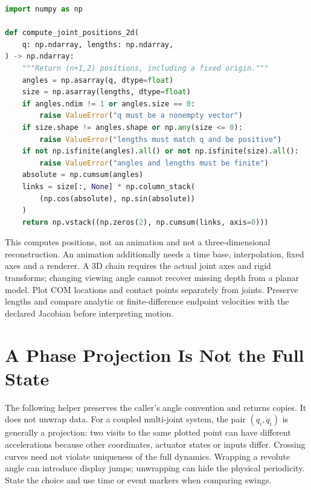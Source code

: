 \begin{lstlisting}[language=Python, caption={Planar Joint Positions With Relative Angles}]
import numpy as np

def compute_joint_positions_2d(
    q: np.ndarray, lengths: np.ndarray,
) -> np.ndarray:
    """Return (n+1,2) positions, including a fixed origin."""
    angles = np.asarray(q, dtype=float)
    size = np.asarray(lengths, dtype=float)
    if angles.ndim != 1 or angles.size == 0:
        raise ValueError("q must be a nonempty vector")
    if size.shape != angles.shape or np.any(size <= 0):
        raise ValueError("lengths must match q and be positive")
    if not np.isfinite(angles).all() or not np.isfinite(size).all():
        raise ValueError("angles and lengths must be finite")
    absolute = np.cumsum(angles)
    links = size[:, None] * np.column_stack(
        (np.cos(absolute), np.sin(absolute))
    )
    return np.vstack((np.zeros(2), np.cumsum(links, axis=0)))
\end{lstlisting}

This computes positions, not an animation and not a three-dimensional
reconstruction. An animation additionally needs a time base, interpolation,
fixed axes and a renderer. A 3D chain requires the actual joint axes and
rigid transforms; changing viewing angle cannot recover missing depth from a
planar model. Plot COM locations and contact points separately from joints.
Preserve lengths and compare analytic or finite-difference endpoint velocities
with the declared Jacobian before interpreting motion.

\section{A Phase Projection Is Not the Full State}

The following helper preserves the caller's angle convention and returns
copies. It does not unwrap data. For a coupled multi-joint system, the pair
$(q_i,\dot q_i)$ is generally a projection: two visits to the same plotted
point can have different accelerations because other coordinates, actuator
states or inputs differ. Crossing curves need not violate uniqueness of the
full dynamics. Wrapping a revolute angle can introduce display jumps;
unwrapping can hide the physical periodicity. State the choice and use time
or event markers when comparing swings.

